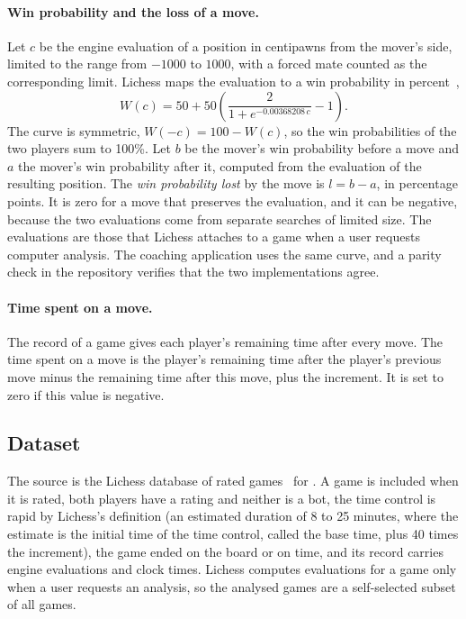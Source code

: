 \documentclass[11pt]{article}
\begin{document}
\paragraph{Win probability and the loss of a move.}
Let $c$ be the engine evaluation of a position in centipawns from the mover's
side, limited to the range from $-1000$ to $1000$, with a forced mate counted
as the corresponding limit. Lichess maps the evaluation to a win probability
in percent~\cite{lichessaccuracy},
\[
W(c) = 50 + 50\left(\frac{2}{1 + e^{-0.00368208\,c}} - 1\right).
\]
The curve is symmetric, $W(-c) = 100 - W(c)$, so the win probabilities of the
two players sum to 100\%. Let $b$ be the mover's win probability before a
move and $a$ the mover's win probability after it, computed from the
evaluation of the resulting position. The \emph{win probability lost} by the
move is $l = b - a$, in percentage points. It is zero for a move that
preserves the evaluation, and it can be negative, because the two evaluations
come from separate searches of limited size. The evaluations are those that
Lichess attaches to a game when a user requests computer analysis. The
coaching application uses the same curve, and a parity check in the
repository verifies that the two implementations agree.

\paragraph{Time spent on a move.}
The record of a game gives each player's remaining time after every move. The
time spent on a move is the player's remaining time after the player's
previous move minus the remaining time after this move, plus the increment.
It is set to zero if this value is negative.

\subsection{Dataset}

The source is the Lichess database of rated games~\cite{lichessdb} for
. A game is included when it is rated, both players have a
rating and neither is a bot, the time control is rapid by Lichess's
definition (an estimated duration of 8 to 25 minutes, where the estimate is
the initial time of the time control, called the base time, plus 40 times the
increment), the game ended on the board
or on time, and its record carries engine evaluations and clock times.
Lichess computes evaluations for a game only when a user requests an
analysis, so the analysed games are a self-selected subset of all games.
\end{document}

